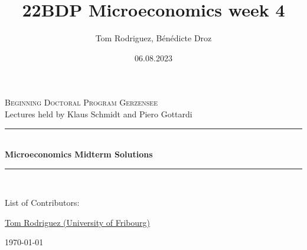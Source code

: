 \documentclass[12pt]{article}
\title{22BDP Microeconomics week 4}
\author{Tom Rodriguez, Bénédicte Droz}
\date{06.08.2023}
\begin{document}
\begin{titlepage}
	
	\newcommand{\HRule}{\rule{\linewidth}{0.5mm}} %
	
	\center %
	
	
	\textsc{\large Beginning Doctoral Program Gerzensee}\\[0.5cm] %
	{\large Lectures held by Klaus Schmidt and Piero Gottardi}\\[1cm] %
	
	
	
	\HRule \\[1.0cm]
	{ \LARGE \bfseries Microeconomics Midterm Solutions}\\[0.4cm] %
	\HRule \\[2cm]
	
	

	
	\begin{flushleft}
        \Large List of Contributors:
        
		{\large 
            \href{https://rodrigueztom.github.io}{Tom Rodriguez (University of Fribourg)}
        }
	\end{flushleft}
	
	
	
	{\large \today} %
	
	\vfill 
	
\end{titlepage}
\end{document}
